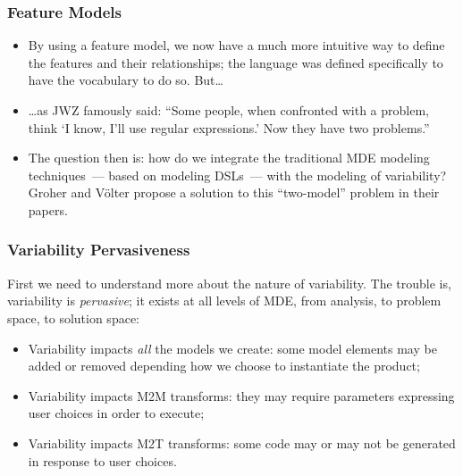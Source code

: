 \documentclass{beamer}
\begin{document}
\begin{frame}
\frametitle{Feature Models}

\begin{itemize}

\item By using a feature model, we now have a much more intuitive way
  to define the features and their relationships; the language was
  defined specifically to have the vocabulary to do so. But\ldots

  \pause

\item \ldots as JWZ famously said: \enquote{Some people, when
  confronted with a problem, think \enquote{I know, I'll use regular
    expressions.} Now they have two problems.}

  \pause

\item The question then is: how do we integrate the traditional
  \ac{MDE} modeling techniques~--- based on modeling \ac{DSL}s~---
  with the modeling of variability? Groher and V{\"o}lter propose a
  solution to this ``two-model'' problem in their papers.

\end{itemize}

\end{frame}

\begin{frame}
\frametitle{Variability Pervasiveness}

First we need to understand more about the nature of variability. The
trouble is, variability is \emph{pervasive}; it exists at all levels
of \ac{MDE}, from analysis, to problem space, to solution space:

\pause

\begin{itemize}
\item Variability impacts \emph{all} the models we create: some
  model elements may be added or removed depending how we choose to
  instantiate the product;

  \pause

\item Variability impacts \ac{M2M} transforms: they may require
  parameters expressing user choices in order to execute;

  \pause

\item Variability impacts \ac{M2T} transforms: some code may or may
  not be generated in response to user choices.

\end{itemize}

\end{frame}
\end{document}
